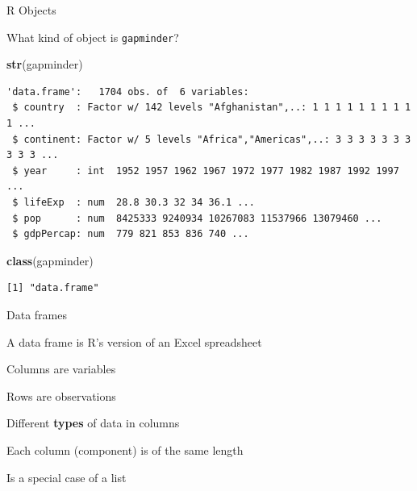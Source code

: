 \documentclass[10pt,ignorenonframetext,compress, aspectratio=169]{beamer}
\newenvironment{Shaded}{\begin{snugshade}}{\end{snugshade}}
\newcommand{\KeywordTok}[1]{\textcolor[rgb]{0.13,0.29,0.53}{\textbf{{#1}}}}
\newcommand{\NormalTok}[1]{{#1}}
\begin{document}
\begin{frame}[fragile]{R Objects}

What kind of object is \texttt{gapminder}?

\scriptsize

\begin{Shaded}
\begin{Highlighting}[]
\KeywordTok{str}\NormalTok{(gapminder)}
\end{Highlighting}
\end{Shaded}

\begin{verbatim}
'data.frame':   1704 obs. of  6 variables:
 $ country  : Factor w/ 142 levels "Afghanistan",..: 1 1 1 1 1 1 1 1 1 1 ...
 $ continent: Factor w/ 5 levels "Africa","Americas",..: 3 3 3 3 3 3 3 3 3 3 ...
 $ year     : int  1952 1957 1962 1967 1972 1977 1982 1987 1992 1997 ...
 $ lifeExp  : num  28.8 30.3 32 34 36.1 ...
 $ pop      : num  8425333 9240934 10267083 11537966 13079460 ...
 $ gdpPercap: num  779 821 853 836 740 ...
\end{verbatim}

\begin{Shaded}
\begin{Highlighting}[]
\KeywordTok{class}\NormalTok{(gapminder)}
\end{Highlighting}
\end{Shaded}

\begin{verbatim}
[1] "data.frame"
\end{verbatim}

\normalsize

\end{frame}

\begin{frame}{Data frames}

A \alert{data frame} is R's version of an Excel spreadsheet

Columns are variables

Rows are observations

Different \textbf{types} of data in columns

Each column (\alert{component}) is of the same length

Is a special case of a list

\end{frame}
\end{document}
